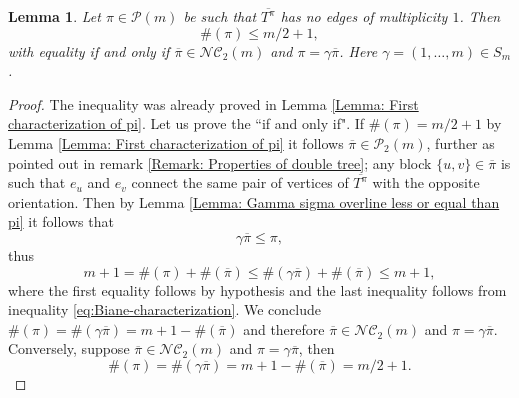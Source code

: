 \documentclass{article}
\newcommand{\paperfigurefont}{%
  \sffamily\sansmath
  \captionsetup{
    font={small,sf},
    labelfont={bf,sf}
  }%
}
\newtheorem{lemma}      [theorem]{Lemma}
\theoremstyle{definition}
\newcommand{\cP}{\mathcal{P}}
\newcommand{\NC}{\mathcal{NC}}
\begin{document}
{\begin{lemma}\label{Lemma: Second characterization of pi}
Let $\pi\in \cP(m)$ be such that $\overline{T^\pi}$ has no edges of multiplicity $1$. Then
$$\#(\pi)\leq m/2+1,$$
with equality if and only if $\overline{\pi}\in \NC_2(m)$ and $\pi=\gamma\overline{\pi}$. Here $\gamma=(1,\dots,m)\in S_m$.
\end{lemma}
\begin{proof}
The inequality was already proved in Lemma \ref{Lemma: First characterization of pi}. Let us prove the ``if and only if". If $\#(\pi)=m/2+1$ by Lemma \ref{Lemma: First characterization of pi} it follows $\overline{\pi}\in \cP_2(m)$, further as pointed out in remark \ref{Remark: Properties of double tree}; any block $\{u,v\}\in\overline{\pi}$ is such that $e_u$ and $e_v$ connect the same pair of vertices of $\overline{T^\pi}$ with the opposite orientation. Then by Lemma \ref{Lemma: Gamma sigma overline less or equal than pi} it follows that
$$\gamma\overline{\pi}\leq \pi,$$
thus
$$m+1=\#(\pi)+\#(\overline{\pi})\leq \#(\gamma\overline{\pi})+\#(\overline{\pi})\leq m+1,$$
where the first equality follows by hypothesis and the last inequality follows from inequality \ref{eq:Biane-characterization}. We conclude $\#(\pi)=\#(\gamma\overline{\pi})=m+1-\#(\overline{\pi})$ and therefore $\overline{\pi}\in \NC_2(m)$ and $\pi=\gamma\overline{\pi}$. Conversely, suppose $\overline{\pi}\in \NC_2(m)$ and $\pi=\gamma\overline{\pi}$, then
$$\#(\pi)=\#(\gamma\overline{\pi})=m+1-\#(\overline{\pi})=m/2+1.$$
\end{proof}

\begin{figure}[htbp]
\centering
\paperfigurefont
\begin{minipage}{0.43\linewidth}
\centering
{}
\end{minipage}\hfill
\begin{minipage}{0.53\linewidth}
\centering
{}
\end{minipage}
\end{figure}}
\end{document}
